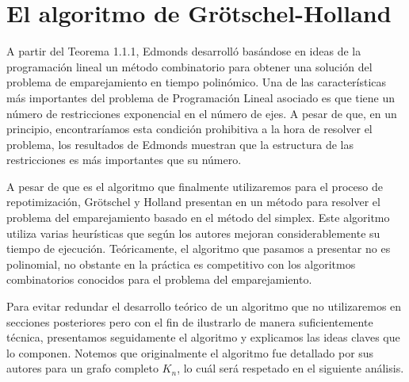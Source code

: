 \documentclass[twoside,a4paper,openright,12pt]{book}
\begin{document}
\section{El algoritmo de Grötschel-Holland}
A partir del Teorema 1.1.1, Edmonds desarrolló basándose en ideas de la programación lineal un método combinatorio \cite{edmond} para obtener una solución del problema de emparejamiento en tiempo polinómico. Una de las características más importantes del problema de Programación Lineal asociado es que tiene un número de restricciones exponencial en el número de ejes. A pesar de que, en un principio, encontraríamos esta condición prohibitiva a la hora de resolver el problema, los resultados de Edmonds muestran que la estructura de las restricciones es más importantes que su número. 

A pesar de que es el algoritmo que finalmente utilizaremos para el proceso de repotimización, Grötschel y Holland presentan en \cite{holland} un método para resolver el problema del emparejamiento basado en el método del simplex. Este algoritmo utiliza varias heurísticas que según los autores mejoran considerablemente su tiempo de ejecución. Teóricamente, el algoritmo que pasamos a presentar no es polinomial, no obstante en la práctica es competitivo con los algoritmos combinatorios conocidos para el problema del emparejamiento.

Para evitar redundar el desarrollo teórico de un algoritmo que no utilizaremos en secciones posteriores pero con el fin de ilustrarlo de manera suficientemente técnica, presentamos seguidamente el algoritmo y explicamos las ideas claves que lo componen. Notemos que originalmente el algoritmo fue detallado por sus autores para un grafo completo $K_n$, lo cuál será respetado en el siguiente análisis.
\end{document}
